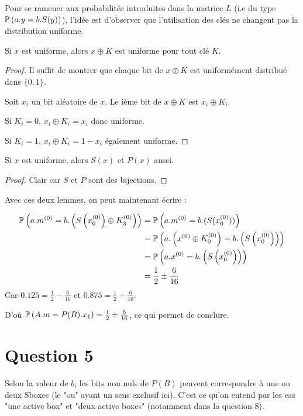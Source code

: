Pour se ramener aux probabilités introduites dans la matrice $L$ (i.e du type $\mathbb{P}\left( a.y = b.S(y) \right)$), l'idée est d'observer que l'utilisation des clés ne changent pas la distribution uniforme.

\begin{lemma}
	Si $x$ est uniforme, alors $x \oplus K$ est uniforme pour tout clé $K$.
\end{lemma}

\begin{proof}
	Il suffit de montrer que chaque bit de $x \oplus K$ est uniformément distribué dans $\{0,1\}$.

	Soit $x_i$ un bit aléatoire de $x$. Le ième bit de $x \oplus K$ est $x_i \oplus K_i$.

	Si $K_i = 0$, $x_i \oplus K_i = x_i$ donc uniforme.

	Si $K_i = 1$, $x_i \oplus K_i = 1 - x_i$ également uniforme. 
\end{proof}

\begin{lemma}
	Si $x$ est uniforme, alors $S(x)$ et $P(x)$ aussi.
\end{lemma}
\begin{proof}
	Clair car $S$ et $P$ sont des bijections.
\end{proof}

Avec ces deux lemmes, on peut maintenant écrire :

\begin{align*}
\mathbb{P}\left( a.m^{(0)}= b.\left (S\left (x_0^{(0)}\right ) \oplus K_3^{(0)}\right ) \right) &= \mathbb{P}\left( a.m^{(0)} = b.(S(x_0^{(0)})) \right) \\
													&= \mathbb{P}\left( a.\left(x^{(0)} \oplus K_0^{(0)}\right ) =  b.\left (S\left (x_0^{(0)}\right )\right ) \right) \\
													&= \mathbb{P}\left( a.x^{(0)} = b.\left(S\left(x_0^{\left(0\right)}\right)\right) \right) \\
													&= \frac{1}{2} \pm \frac{6}{16}
\end{align*}
Car $0.125 = \frac{1}{2} - \frac{6}{16}$ et $0.875 = \frac{1}{2} + \frac{6}{16}$.

D'où $\mathbb{P}\left( A.m = P(B).x_1 \right) = \frac{1}{2} \pm \frac{6}{16}$, ce qui permet de conclure.

\section*{Question 5}

Selon la valeur de $b$, les bits non nuls de $P(B)$ peuvent correspondre à une ou deux Sboxes (le "ou" ayant un sens exclusif ici). C'est ce qu'on entend par les cas "une active box" et "deux active boxes" (notamment dans la question 8).

